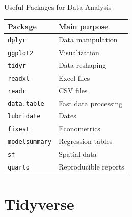 \documentclass[aspectratio=169,11pt]{beamer}
\begin{document}
	\begin{frame}{Useful Packages for Data Analysis}
		
		\begin{table}
			\centering
			\begin{tabular}{ll}
				\toprule
				Package & Main purpose \\
				\midrule
				\texttt{dplyr} & Data manipulation \\
				\texttt{ggplot2} & Visualization \\
				\texttt{tidyr} & Data reshaping \\
				\texttt{readxl} & Excel files \\
				\texttt{readr} & CSV files \\
				\texttt{data.table} & Fast data processing \\
				\texttt{lubridate} & Dates \\
				\texttt{fixest} & Econometrics \\
				\texttt{modelsummary} & Regression tables \\
				\texttt{sf} & Spatial data \\
				\texttt{quarto} & Reproducible reports \\
				\bottomrule
			\end{tabular}
		\end{table}
		
	\end{frame}
	
	\section{Tidyverse}
	
\end{document}
